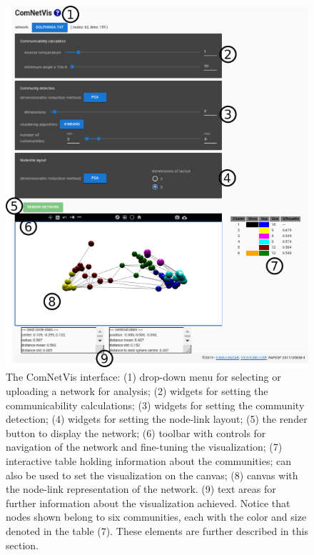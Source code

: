 \documentclass[Afour,sagev,times]{sagej}
\begin{document}
\begin{figure}\centering
 \includegraphics[width=\textwidth]{figs/overall}
  \caption{The ComNetVis interface: 
  (1) drop-down menu for selecting or uploading a network for analysis;
  (2) widgets for setting the communicability calculations;
  (3) widgets for setting the community detection;
  (4) widgets for setting the node-link layout;
  (5) the render button to display the network;
  (6) toolbar with controls for navigation of the network and fine-tuning the visualization;
  (7) interactive table holding information about the communities;
  can also be used to set the visualization on the canvas;
  (8) canvas with the node-link representation of the network.
  (9) text areas for further information about the visualization achieved.
  Notice that nodes shown belong to six communities, each with the color and size denoted in the table (7).
  These elements are further described in this section.
  }\label{fpage0}
\end{figure}
\end{document}
